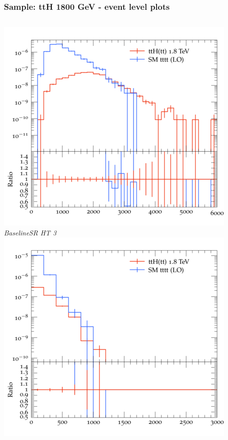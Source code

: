 \documentclass{beamer}
\begin{document}
\begin{frame}
\frametitle{Sample: ttH 1800 GeV - event level plots}
\begin{columns}
\includegraphics[width=\textwidth]{../plots/ttH_1800/tttt_ttH_1LOS/BaselineSR_HT_3.png}\\
\textit{\small BaselineSR HT 3}
\includegraphics[width=\textwidth]{../plots/ttH_1800/tttt_ttH_1LOS/BaselineSR_MET.png}\\

\end{columns}
\end{frame}
\end{document}
